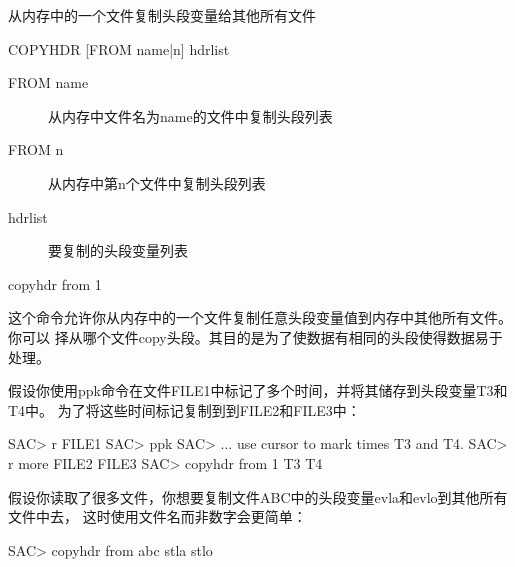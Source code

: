 \label{cmd:copyhdr}

从内存中的一个文件复制头段变量给其他所有文件

\begin{SACSTX}
COPYHDR [FROM name|n] hdrlist
\end{SACSTX}

\begin{description}
\item [FROM name] 从内存中文件名为name的文件中复制头段列表
\item [FROM n] 从内存中第n个文件中复制头段列表
\item [hdrlist] 要复制的头段变量列表
\end{description}

\begin{SACDFT}
copyhdr from 1
\end{SACDFT}

这个命令允许你从内存中的一个文件复制任意头段变量值到内存中其他所有文件。你可以
择从哪个文件copy头段。其目的是为了使数据有相同的头段使得数据易于处理。

假设你使用ppk命令在文件FILE1中标记了多个时间，并将其储存到头段变量T3和T4中。
为了将这些时间标记复制到到FILE2和FILE3中：
\begin{SACCode}
SAC> r FILE1
SAC> ppk
SAC> ... use cursor to mark times T3 and T4.
SAC> r more FILE2 FILE3
SAC> copyhdr from 1 T3 T4
\end{SACCode}

假设你读取了很多文件，你想要复制文件ABC中的头段变量evla和evlo到其他所有文件中去，
这时使用文件名而非数字会更简单：
\begin{SACCode}
SAC> copyhdr from abc stla stlo
\end{SACCode}
